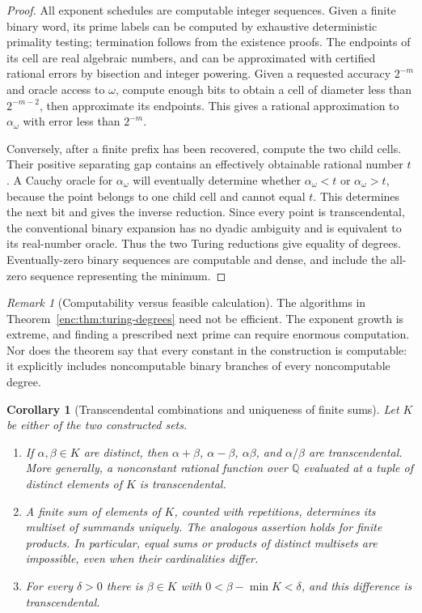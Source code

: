 \documentclass[11pt,a4paper]{article}
\newtheorem{corollary}[theorem]{Corollary}
\theoremstyle{definition}
\theoremstyle{remark}
\newtheorem{remark}[theorem]{Remark}
\numberwithin{equation}{section}
\begin{document}
\begin{proof}
All exponent schedules are computable integer sequences.  Given a finite
binary word, its prime labels can be computed by exhaustive deterministic
primality testing; termination follows from the existence proofs.  The
endpoints of its cell are real algebraic numbers, and can be approximated
with certified rational errors by bisection and integer powering.
Given a requested accuracy $2^{-m}$ and oracle access to $\omega$, compute
enough bits to obtain a cell of diameter less than $2^{-m-2}$, then
approximate its endpoints.  This gives a rational approximation to
$\alpha_\omega$ with error less than $2^{-m}$.

Conversely, after a finite prefix has been recovered, compute the two
child cells.  Their positive separating gap contains an effectively
obtainable rational number $t$.  A Cauchy oracle for $\alpha_\omega$ will
eventually determine whether $\alpha_\omega<t$ or $\alpha_\omega>t$,
because the point belongs to one child cell and cannot equal $t$.
This determines the next bit and gives the inverse reduction.
Since every point is transcendental, the conventional binary expansion
has no dyadic ambiguity and is equivalent to its real-number oracle.
Thus the two Turing reductions give equality of degrees.  Eventually-zero
binary sequences are computable and dense, and include the all-zero
sequence representing the minimum.
\end{proof}

\begin{remark}[Computability versus feasible calculation]
The algorithms in Theorem~\ref{enc:thm:turing-degrees} need not be efficient.
The exponent growth is extreme, and finding a prescribed next prime can
require enormous computation.  Nor does the theorem say that every
constant in the construction is computable: it explicitly includes
noncomputable binary branches of every noncomputable degree.
\end{remark}

\begin{corollary}[Transcendental combinations and uniqueness of finite sums]
\label{enc:cor:transcendental-combinations}
Let $K$ be either of the two constructed sets.
\begin{enumerate}
 \item If $\alpha,\beta\in K$ are distinct, then
 $\alpha+\beta$, $\alpha-\beta$, $\alpha\beta$, and $\alpha/\beta$ are
 transcendental.  More generally, a nonconstant rational function over
 $\mathbb Q$ evaluated at a tuple of distinct elements of $K$ is
 transcendental.
 \item A finite sum of elements of $K$, counted with repetitions,
 determines its multiset of summands uniquely.  The analogous assertion
 holds for finite products.  In particular, equal sums or products of
 distinct multisets are impossible, even when their cardinalities differ.
 \item For every $\delta>0$ there is $\beta\in K$ with
 $0<\beta-\min K<\delta$, and this difference is transcendental.
\end{enumerate}
\end{corollary}
\end{document}
